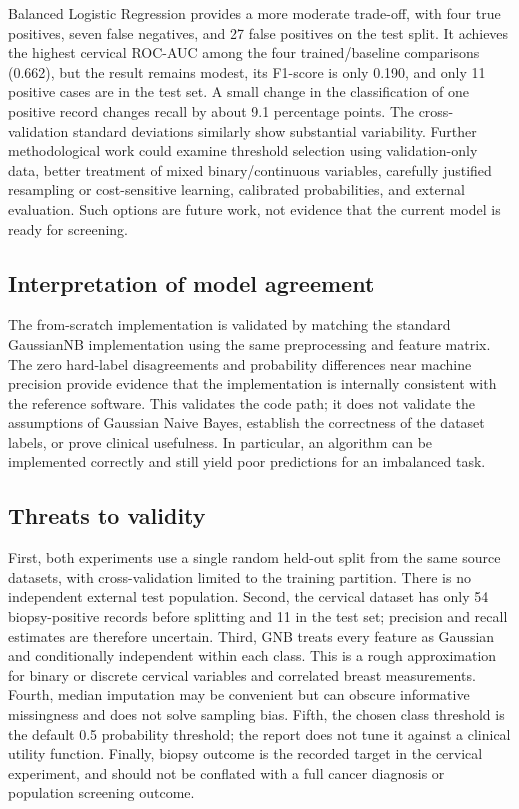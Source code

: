 \documentclass[conference]{IEEEtran}
\begin{document}
Balanced Logistic Regression provides a more moderate trade-off, with four true positives, seven false negatives, and 27 false positives on the test split. It achieves the highest cervical ROC-AUC among the four trained/baseline comparisons (0.662), but the result remains modest, its F1-score is only 0.190, and only 11 positive cases are in the test set. A small change in the classification of one positive record changes recall by about 9.1 percentage points. The cross-validation standard deviations similarly show substantial variability. Further methodological work could examine threshold selection using validation-only data, better treatment of mixed binary/continuous variables, carefully justified resampling or cost-sensitive learning, calibrated probabilities, and external evaluation. Such options are future work, not evidence that the current model is ready for screening.

\subsection{Interpretation of model agreement}
The from-scratch implementation is validated by matching the standard GaussianNB implementation using the same preprocessing and feature matrix. The zero hard-label disagreements and probability differences near machine precision provide evidence that the implementation is internally consistent with the reference software. This validates the code path; it does not validate the assumptions of Gaussian Naive Bayes, establish the correctness of the dataset labels, or prove clinical usefulness. In particular, an algorithm can be implemented correctly and still yield poor predictions for an imbalanced task.

\subsection{Threats to validity}
First, both experiments use a single random held-out split from the same source datasets, with cross-validation limited to the training partition. There is no independent external test population. Second, the cervical dataset has only 54 biopsy-positive records before splitting and 11 in the test set; precision and recall estimates are therefore uncertain. Third, GNB treats every feature as Gaussian and conditionally independent within each class. This is a rough approximation for binary or discrete cervical variables and correlated breast measurements. Fourth, median imputation may be convenient but can obscure informative missingness and does not solve sampling bias. Fifth, the chosen class threshold is the default 0.5 probability threshold; the report does not tune it against a clinical utility function. Finally, biopsy outcome is the recorded target in the cervical experiment, and should not be conflated with a full cancer diagnosis or population screening outcome.
\end{document}
